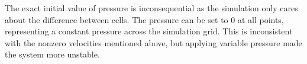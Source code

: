 The exact initial value of pressure is inconsequential as the simulation only cares about the difference between cells.
The pressure can be set to 0 at all points, representing a constant pressure across the simulation grid.
This is inconsistent with the nonzero velocities mentioned above, but applying variable pressure made the system more unstable.